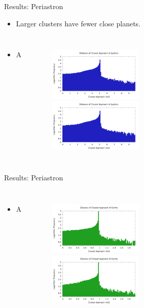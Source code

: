\documentclass{beamer}
\begin{document}
\begin{frame}{Results: Periastron}
    \begin{itemize}
        \item Larger clusters have fewer close planets.
    \end{itemize}
    \begin{columns}
        \begin{itemize}
            \item A
        \end{itemize}
        \begin{figure}
            \includegraphics[height=1.00in]{periastron_jupiter_1000.png} \\
            \includegraphics[height=1.00in]{periastron_jupiter_4000.png}
        \end{figure}
    \end{columns}
\end{frame}

\begin{frame}{Results: Periastron}
    \begin{columns}
        \begin{itemize}
            \item A
        \end{itemize}
        \begin{figure}
            \includegraphics[height=1.00in]{periastron_earth_1000.png} \\
            \includegraphics[height=1.00in]{periastron_earth_4000.png}
        \end{figure}
    \end{columns}
\end{frame}
\end{document}

